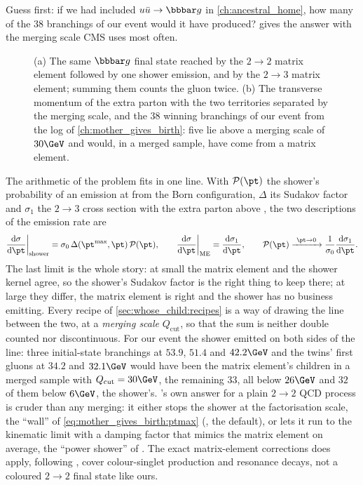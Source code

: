Guess first: if we had included $u\bar u\to\bbbar g$ in \cref{ch:ancestral_home},
how many of the $38$ branchings of our event would it have produced?
 gives the answer with the merging
scale CMS uses most often.

\begin{figure}[htbp]\centering
\resizebox{\textwidth}{!}{}
\caption[The same gluon from two parents, and the merging scale against the branchings of our event]{(a) The same $\bbbar g$ final state reached by the $2\to2$ matrix element followed by one shower emission, and by the $2\to3$ matrix element; summing them counts the gluon twice. (b) The transverse momentum of the extra parton with the two territories separated by the merging scale, and the $38$ winning branchings of our event from the  log of \cref{ch:mother_gives_birth}: five lie above a merging scale of $30\GeV$ and would, in a merged sample, have come from a matrix element.}
\label{fig:whose_child:double_counting}
\end{figure}

The arithmetic of the problem fits in one line. With $\mathcal P(\pt)$ the
shower's probability of an emission at \pt from the Born configuration,
$\Delta$ its Sudakov factor and $\sigma_1$ the $2\to3$ cross section with the
extra parton above \pt, the two descriptions of the emission rate are
\begin{equation}
  \frac{\mathrm d\sigma}{\mathrm d\pt}\bigg|_{\mathrm{shower}}
   = \sigma_0\,\Delta(\pt^{\max},\pt)\,\mathcal P(\pt),
  \qquad
  \frac{\mathrm d\sigma}{\mathrm d\pt}\bigg|_{\mathrm{ME}}
   = \frac{\mathrm d\sigma_1}{\mathrm d\pt},
  \qquad
  \mathcal P(\pt)\xrightarrow{\ \pt\to0\ }\frac{1}{\sigma_0}\frac{\mathrm d\sigma_1}{\mathrm d\pt}.
  \label{eq:whose_child:two_rates}
\end{equation}
The last limit is the whole story: at small \pt the matrix element and the
shower kernel agree, so the shower's Sudakov factor is the right thing to
keep there; at large \pt they differ, the matrix element is right and the
shower has no business emitting. Every recipe of
\cref{sec:whose_child:recipes} is a way of drawing the line between the
two, at a \emph{merging scale} $Q_{\mathrm{cut}}$, so that the sum is
neither double counted nor discontinuous. For our event the shower emitted
on both sides of the line: three initial-state branchings at $53.9$, $51.4$
and $42.2\GeV$ and the twins' first gluons at $34.2$ and $32.1\GeV$ would
have been the matrix element's children in a merged sample with
$Q_{\mathrm{cut}}=30\GeV$, the remaining $33$, all below $26\GeV$ and
$32$ of them below $6\GeV$, the shower's. \PYTHIA's own answer for a plain
$2\to2$ QCD process is cruder than any merging: it either stops the shower
at the factorisation scale, the ``wall'' of \cref{eq:mother_gives_birth:ptmax}
(, the \CMSSW default), or lets it run to the kinematic
limit with a damping factor that mimics the matrix element on average, the
``power shower'' of \cite{Plehn:2005cq,Corke:2010zj}. The exact
matrix-element corrections \PYTHIA does apply, following
\cite{Miu:1998ju,Norrbin:2000uu}, cover colour-singlet production and
resonance decays, not a coloured $2\to2$ final state like ours.

